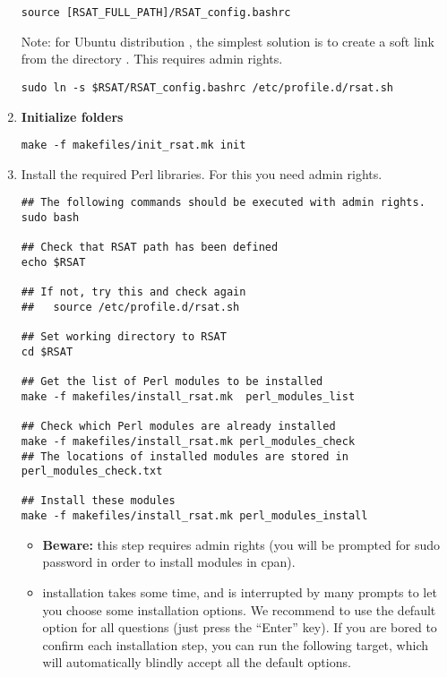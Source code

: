 \documentclass[12pt,a4paper, oneside]{scrreprt} %
\begin{document}
\begin{enumerate}
\begin{verbatim}
source [RSAT_FULL_PATH]/RSAT_config.bashrc
\end{verbatim}


Note: for Ubuntu distribution , the simplest solution is to create a
soft link from the directory . This requires
admin rights.

\begin{verbatim}
sudo ln -s $RSAT/RSAT_config.bashrc /etc/profile.d/rsat.sh
\end{verbatim}

\item \textbf{Initialize \RSAT folders}

  \begin{lstlisting}
make -f makefiles/init_rsat.mk init
  \end{lstlisting}
  
\item Install the required Perl libraries. For this you need admin
  rights.

  \begin{lstlisting}
## The following commands should be executed with admin rights.
sudo bash

## Check that RSAT path has been defined
echo $RSAT

## If not, try this and check again
##   source /etc/profile.d/rsat.sh

## Set working directory to RSAT
cd $RSAT

## Get the list of Perl modules to be installed
make -f makefiles/install_rsat.mk  perl_modules_list

## Check which Perl modules are already installed
make -f makefiles/install_rsat.mk perl_modules_check
## The locations of installed modules are stored in perl_modules_check.txt

## Install these modules
make -f makefiles/install_rsat.mk perl_modules_install
  \end{lstlisting}


  \begin{itemize}
  \item \textbf{Beware: } this step requires admin rights (you will be
    prompted for sudo password in order to install modules in cpan).
    
  \item {} installation takes some time, and is
    interrupted by many prompts to let you choose some installation
    options. We recommend to use the default option for all questions
    (just press the ``Enter'' key). If you are bored to confirm each
    installation step, you can run the following target, which will
    automatically blindly accept all the default options.


\end{itemize}
\end{enumerate}
\end{document}
